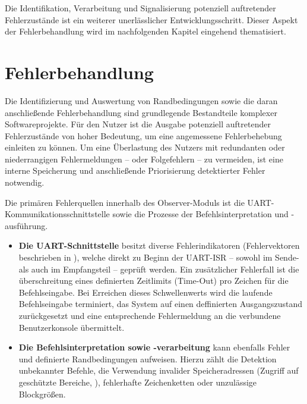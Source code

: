 Die Identifikation, Verarbeitung und Signalisierung potenziell auftretender Fehlerzust\"ande ist ein weiterer unerl\"asslicher Entwicklungsschritt. Dieser Aspekt der Fehlerbehandlung wird im nachfolgenden Kapitel eingehend thematisiert.\AI


\newpage
\section{Fehlerbehandlung}
\label{sec:Fehlerbehandlung}

Die Identifizierung und Auswertung von Randbedingungen sowie die daran anschlie{\ss}ende Fehlerbehandlung sind grundlegende Bestandteile komplexer Softwareprojekte. F\"ur den Nutzer ist die Ausgabe potenziell auftretender Fehlerzust\"ande von hoher Bedeutung, um eine angemessene Fehlerbehebung einleiten zu k\"onnen. Um eine \"Uberlastung des Nutzers mit redundanten oder niederrangigen Fehlermeldungen -- oder Folgefehlern -- zu vermeiden, ist eine interne Speicherung und anschlie{\ss}ende Priorisierung detektierter Fehler notwendig. 

Die prim\"aren Fehlerquellen innerhalb des Observer-Moduls ist die UART- Kommunikationsschnittstelle sowie die Prozesse der Befehlsinterpretation und -ausf\"uhrung.
\begin{itemize}
	\item \textbf{Die UART-Schnittstelle} besitzt diverse Fehlerindikatoren (Fehlervektoren beschrieben in ), welche direkt zu Beginn der UART-ISR -- sowohl im Sende- als auch im Empfangsteil -- gepr\"uft werden. Ein zus\"atzlicher Fehlerfall ist die \"uberschreitung eines definierten Zeitlimits (Time-Out) pro Zeichen f\"ur die Befehlseingabe. Bei Erreichen dieses Schwellenwerts wird die laufende Befehlseingabe terminiert, das System auf einen deffinierten Ausgangszustand zur\"uckgesetzt und eine entsprechende Fehlermeldung an die verbundene Benutzerkonsole \"ubermittelt.
	
	\item \textbf{Die Befehlsinterpretation sowie -verarbeitung} kann ebenfalls Fehler und definierte Randbedingungen aufweisen. Hierzu z\"ahlt die Detektion unbekannter Befehle, die Verwendung invalider Speicheradressen (\zB Zugriff auf gesch\"utzte Bereiche, \Vgl {}), fehlerhafte Zeichenketten oder unzul\"assige Blockgr\"o{\ss}en.
\end{itemize}

